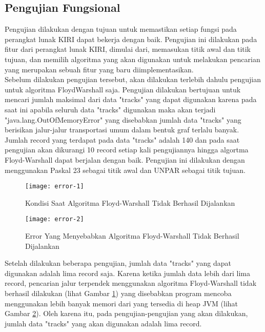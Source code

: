 \subsection{Pengujian Fungsional}
\label{subsec:pengujianfungsional}
Pengujian dilakukan dengan tujuan untuk memastikan setiap fungsi pada perangkat lunak KIRI dapat bekerja dengan baik. Pengujian ini dilakukan pada fitur dari perangkat lunak KIRI, dimulai dari, memasukan titik awal dan titik tujuan, dan memilih algoritma yang akan digunakan untuk melakukan pencarian yang merupakan sebuah fitur yang baru diimplementasikan.
\\
Sebelum dilakukan pengujian tersebut, akan dilakukan terlebih dahulu pengujian untuk algoritma FloydWarshall saja. Pengujian dilakukan bertujuan untuk mencari jumlah maksimal dari data "tracks" yang dapat digunakan karena pada saat ini apabila seluruh data "tracks" digunakan maka akan terjadi "java.lang.OutOfMemoryError" yang disebabkan jumlah data "tracks" yang berisikan jalur-jalur transportasi umum dalam bentuk graf terlalu banyak. Jumlah record yang terdapat pada data "tracks" adalah 140 dan pada saat pengujian akan dikurangi 10 record setiap kali pengujiannya hingga algortma Floyd-Warshall dapat berjalan dengan baik. Pengujian ini dilakukan dengan menggunakan Paskal 23 sebagai titik awal dan UNPAR sebagai titik tujuan.

\begin{figure}[H]
    \centering
    \texttt{[image: error-1]}
    \caption{Kondisi Saat Algoritma Floyd-Warshall Tidak Berhasil Dijalankan}
    \label{fig:error1}
\end{figure}

\begin{figure}[H]
    \centering
    \texttt{[image: error-2]}
    \caption{Error Yang Menyebabkan Algoritma Floyd-Warshall Tidak Berhasil Dijalankan}
    \label{fig:error2}
\end{figure}

\noindent
Setelah dilakukan beberapa pengujian, jumlah data "tracks" yang dapat digunakan adalah lima record saja. Karena ketika jumlah data lebih dari lima record, pencarian jalur terpendek menggunakan algoritma Floyd-Warshall tidak berhasil dilakukan (lihat Gambar \ref{fig:error1}) yang disebabkan program mencoba menggunakan lebih banyak memori dari yang tersedia di heap JVM (lihat Gambar \ref{fig:error2}). Oleh karena itu, pada pengujian-pengujian yang akan dilakukan, jumlah data "tracks" yang akan digunakan adalah lima record.

